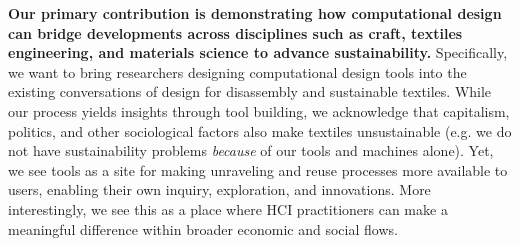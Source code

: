 


\textbf{Our primary contribution is demonstrating how computational design can bridge developments across disciplines such as craft, textiles engineering, and materials science to advance sustainability.} Specifically, we want to bring researchers designing computational design tools into the existing conversations of design for disassembly and sustainable textiles. While our process yields insights through tool building, we acknowledge that capitalism, politics, and other sociological factors also make textiles unsustainable (e.g. we do not have sustainability problems \textit{because} of our tools and machines alone). Yet, we see tools as a site for making unraveling and reuse processes more available to users, enabling their own inquiry, exploration, and innovations. More interestingly, we see this as a place where HCI practitioners can make a meaningful difference within broader economic and social flows.  

